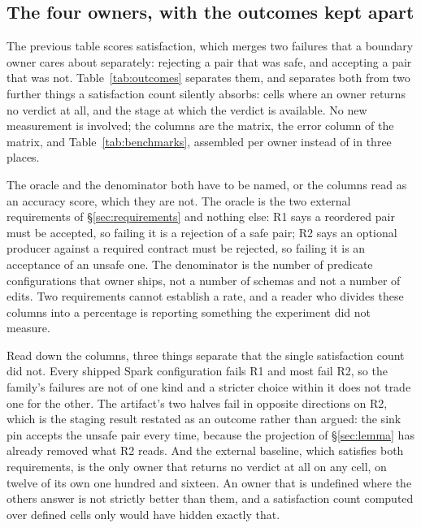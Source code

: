\subsection{The four owners, with the outcomes kept apart}
\label{sec:outcomes}

The previous table scores satisfaction, which merges two failures that a boundary owner cares about separately: rejecting a pair that was safe, and accepting a pair that was not. Table~\ref{tab:outcomes} separates them, and separates both from two further things a satisfaction count silently absorbs: cells where an owner returns no verdict at all, and the stage at which the verdict is available. No new measurement is involved; the columns are the matrix, the error column of the matrix, and Table~\ref{tab:benchmarks}, assembled per owner instead of in three places.

The oracle and the denominator both have to be named, or the columns read as an accuracy score, which they are not. The oracle is the two external requirements of \S\ref{sec:requirements} and nothing else: R1 says a reordered pair must be accepted, so failing it is a rejection of a safe pair; R2 says an optional producer against a required contract must be rejected, so failing it is an acceptance of an unsafe one. The denominator is the number of predicate configurations that owner ships, not a number of schemas and not a number of edits. Two requirements cannot establish a rate, and a reader who divides these columns into a percentage is reporting something the experiment did not measure.

Read down the columns, three things separate that the single satisfaction count did not. Every shipped Spark configuration fails R1 and most fail R2, so the family's failures are not of one kind and a stricter choice within it does not trade one for the other. The artifact's two halves fail in opposite directions on R2, which is the staging result restated as an outcome rather than argued: the sink pin accepts the unsafe pair every time, because the projection of \S\ref{sec:lemma} has already removed what R2 reads. And the external baseline, which satisfies both requirements, is the only owner that returns no verdict at all on any cell, on twelve of its own one hundred and sixteen. An owner that is undefined where the others answer is not strictly better than them, and a satisfaction count computed over defined cells only would have hidden exactly that.

